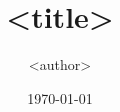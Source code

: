 \documentclass[aspectratio=169]{beamer}
\title{<title>}
\author{<author>}
\institute[XTU]{
<email>\\
\vspace{5pt}
<institute>\\
}
\date[XTU]
{
    \today
}
\numberwithin{subsection}{section}
\begin{document}
\begin{frame}
  \titlepage
\end{frame}
\end{document}
